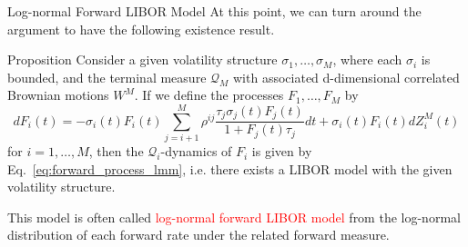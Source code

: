 \documentclass{beamer}
\begin{document}
\begin{frame}{Log-normal Forward LIBOR Model}
	At this point, we can turn around the argument to have the following existence result.
	\begin{block}{Proposition}
		Consider a given volatility structure $\sigma_1,\ldots, \sigma_M$, where each $\sigma_i$ is bounded, and the terminal measure $\mathcal{Q}_M$ with associated d-dimensional correlated Brownian motions $W^M$. If we define the processes $F_1,\ldots, F_M$ by
		\begin{equation}
		dF_i(t) = -\sigma_i(t)F_i(t)\sum_{j=i+1}^M \rho^{ij} \frac{\tau_j\sigma_j(t)F_j(t)}{1+F_j(t)\tau_j} dt + \sigma_i(t)F_i(t)dZ^M_i(t)
		\end{equation}
		for $i = 1,\ldots, M$, then the $\mathcal{Q}_i$-dynamics of $F_i$ is given by Eq.~\ref{eq:forward_process_lmm}, i.e. there exists a LIBOR model with the given volatility structure.
	\end{block}
	This model is often called \textcolor{red}{log-normal forward LIBOR model} from the log-normal distribution of each forward rate under the related forward measure.
\end{frame}

%
\end{document}
